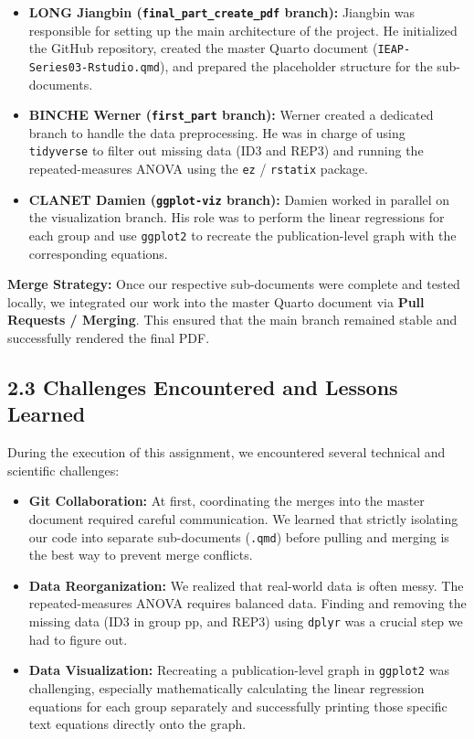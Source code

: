 \documentclass[
  letterpaper,
  DIV=11,
  numbers=noendperiod]{scrartcl}
\providecommand{\tightlist}{%
  \setlength{\itemsep}{0pt}\setlength{\parskip}{0pt}}
\begin{document}
\begin{itemize}
\tightlist
\item
  \textbf{LONG Jiangbin (\texttt{final\_part\_create\_pdf} branch):}
  Jiangbin was responsible for setting up the main architecture of the
  project. He initialized the GitHub repository, created the master
  Quarto document (\texttt{IEAP-Series03-Rstudio.qmd}), and prepared the
  placeholder structure for the sub-documents.
\item
  \textbf{BINCHE Werner (\texttt{first\_part} branch):} Werner created a
  dedicated branch to handle the data preprocessing. He was in charge of
  using \texttt{tidyverse} to filter out missing data (ID3 and REP3) and
  running the repeated-measures ANOVA using the \texttt{ez} /
  \texttt{rstatix} package.
\item
  \textbf{CLANET Damien (\texttt{ggplot-viz} branch):} Damien worked in
  parallel on the visualization branch. His role was to perform the
  linear regressions for each group and use \texttt{ggplot2} to recreate
  the publication-level graph with the corresponding equations.
\end{itemize}

\textbf{Merge Strategy:} Once our respective sub-documents were complete
and tested locally, we integrated our work into the master Quarto
document via \textbf{Pull Requests / Merging}. This ensured that the
main branch remained stable and successfully rendered the final PDF.

\subsection{2.3 Challenges Encountered and Lessons
Learned}\label{challenges-encountered-and-lessons-learned}

During the execution of this assignment, we encountered several
technical and scientific challenges:

\begin{itemize}
\tightlist
\item
  \textbf{Git Collaboration:} At first, coordinating the merges into the
  master document required careful communication. We learned that
  strictly isolating our code into separate sub-documents
  (\texttt{.qmd}) before pulling and merging is the best way to prevent
  merge conflicts.
\item
  \textbf{Data Reorganization:} We realized that real-world data is
  often messy. The repeated-measures ANOVA requires balanced data.
  Finding and removing the missing data (ID3 in group pp, and REP3)
  using \texttt{dplyr} was a crucial step we had to figure out.
\item
  \textbf{Data Visualization:} Recreating a publication-level graph in
  \texttt{ggplot2} was challenging, especially mathematically
  calculating the linear regression equations for each group separately
  and successfully printing those specific text equations directly onto
  the graph.
\end{itemize}
\end{document}
